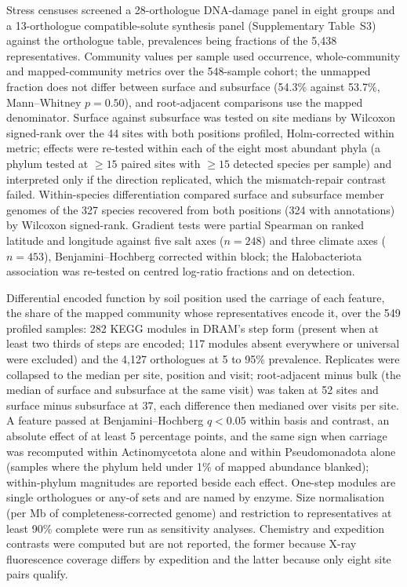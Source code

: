 \documentclass[11pt]{article}
\begin{document}
Stress censuses screened a 28-orthologue DNA-damage panel in eight groups and a 13-orthologue
compatible-solute synthesis panel (Supplementary Table~S3) against the
orthologue table, prevalences being fractions of the 5{,}438 representatives. Community values per
sample used occurrence, whole-community and mapped-community metrics over the 548-sample cohort;
the unmapped fraction does not differ between surface and subsurface (54.3\% against 53.7\%,
Mann--Whitney $p = 0.50$), and root-adjacent comparisons use the mapped denominator. Surface against
subsurface was tested on site medians by Wilcoxon signed-rank over the 44 sites with both positions
profiled, Holm-corrected within metric; effects were re-tested within each of the eight most
abundant phyla (a phylum tested at $\geq 15$ paired sites with $\geq 15$ detected species per
sample) and interpreted only if the direction replicated, which the mismatch-repair contrast failed.
Within-species differentiation compared surface and subsurface member genomes of the 327 species
recovered from both positions (324 with annotations) by Wilcoxon signed-rank. Gradient tests were
partial Spearman on ranked latitude and longitude against five salt axes ($n = 248$) and three
climate axes ($n = 453$), Benjamini--Hochberg corrected within block; the Halobacteriota association
was re-tested on centred log-ratio fractions and on detection.

Differential encoded function by soil position used the carriage of each feature, the share of the
mapped community whose representatives encode it, over the 549 profiled samples: 282 KEGG modules in
DRAM's step form (present when at least two thirds of steps are encoded; 117 modules absent everywhere
or universal were excluded) and the 4{,}127 orthologues at 5 to 95\% prevalence. Replicates were
collapsed to the median per site, position and visit; root-adjacent minus bulk (the median of surface
and subsurface at the same visit) was taken at 52 sites and surface minus subsurface at 37, each
difference then medianed over visits per site. A feature passed at Benjamini--Hochberg $q < 0.05$
within basis and contrast, an absolute effect of at least 5 percentage points, and the same sign when
carriage was recomputed within Actinomycetota alone and within Pseudomonadota alone (samples where
the phylum held under 1\% of mapped abundance blanked); within-phylum magnitudes are reported beside
each effect. One-step modules are single orthologues or any-of sets and are named by enzyme. Size
normalisation (per Mb of completeness-corrected genome) and restriction to representatives at least
90\% complete were run as sensitivity analyses. Chemistry and expedition contrasts were computed but
are not reported, the former because X-ray fluorescence coverage differs by expedition and the latter
because only eight site pairs qualify.
\end{document}
